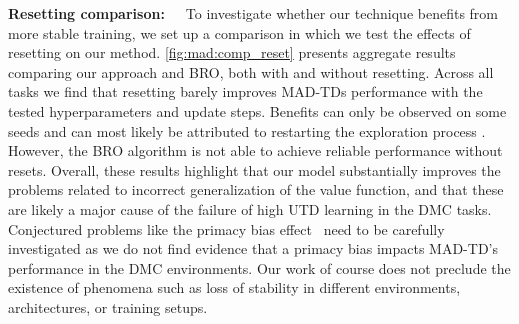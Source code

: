 \textbf{Resetting comparison:}~~~To investigate whether our technique benefits from more stable training, we set up a comparison in which we test the effects of resetting on our method. \autoref{fig:mad:comp_reset} presents aggregate results comparing our approach and BRO, both with and without resetting. 
Across all tasks we find that resetting barely improves MAD-TDs performance with the tested hyperparameters and update steps.
Benefits can only be observed on some seeds and can most likely be attributed to restarting the exploration process \parencite{hussing2024dissecting}.
However, the BRO algorithm is not able to achieve reliable performance without resets.
Overall, these results highlight that our model substantially improves the problems related to incorrect generalization of the value function, and that these are likely a major cause of the failure of high UTD learning in the DMC tasks.
Conjectured problems like the primacy bias effect~\parencite{nikishin2022primacy} need to be carefully investigated as we do not find evidence that a primacy bias impacts MAD-TD's performance in the DMC environments. 
Our work of course does not preclude the existence of phenomena such as loss of stability in different environments, architectures, or training setups.

